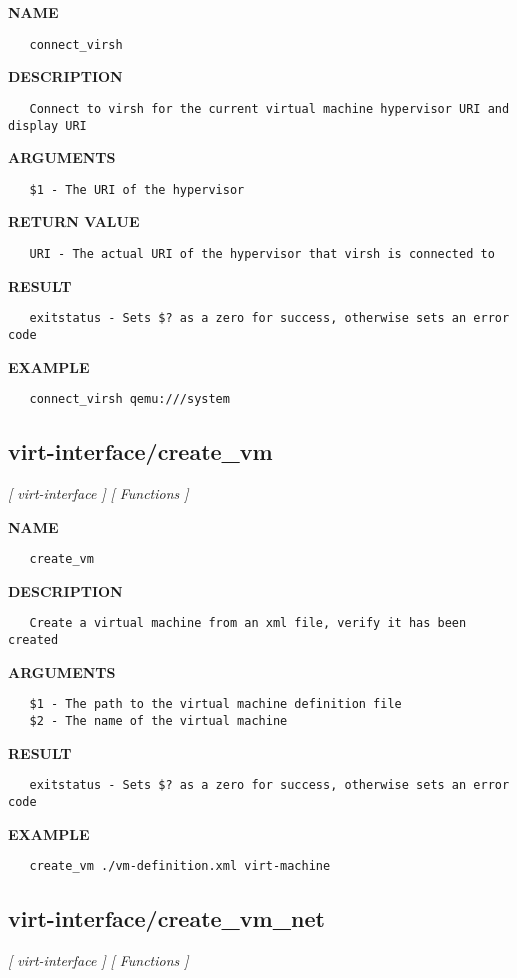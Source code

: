 \label{ch:robo49}
\label{ch:virt_interface_connect_virsh}
\textbf{NAME}
\begin{verbatim}
   connect_virsh
\end{verbatim}
\textbf{DESCRIPTION}
\begin{verbatim}
   Connect to virsh for the current virtual machine hypervisor URI and display URI
\end{verbatim}
\textbf{ARGUMENTS}
\begin{verbatim}
   $1 - The URI of the hypervisor
\end{verbatim}
\textbf{RETURN VALUE}
\begin{verbatim}
   URI - The actual URI of the hypervisor that virsh is connected to
\end{verbatim}
\textbf{RESULT}
\begin{verbatim}
   exitstatus - Sets $? as a zero for success, otherwise sets an error code
\end{verbatim}
\textbf{EXAMPLE}
\begin{verbatim}
   connect_virsh qemu:///system
\end{verbatim}
\newpage
\subsection{virt-interface/create\_vm}
\textsl{[ virt-interface ]}
\textsl{[ Functions ]}

\label{ch:robo50}
\label{ch:virt_interface_create_vm}
\textbf{NAME}
\begin{verbatim}
   create_vm
\end{verbatim}
\textbf{DESCRIPTION}
\begin{verbatim}
   Create a virtual machine from an xml file, verify it has been created 
\end{verbatim}
\textbf{ARGUMENTS}
\begin{verbatim}
   $1 - The path to the virtual machine definition file
   $2 - The name of the virtual machine
\end{verbatim}
\textbf{RESULT}
\begin{verbatim}
   exitstatus - Sets $? as a zero for success, otherwise sets an error code
\end{verbatim}
\textbf{EXAMPLE}
\begin{verbatim}
   create_vm ./vm-definition.xml virt-machine
\end{verbatim}
\newpage
\subsection{virt-interface/create\_vm\_net}
\textsl{[ virt-interface ]}
\textsl{[ Functions ]}

